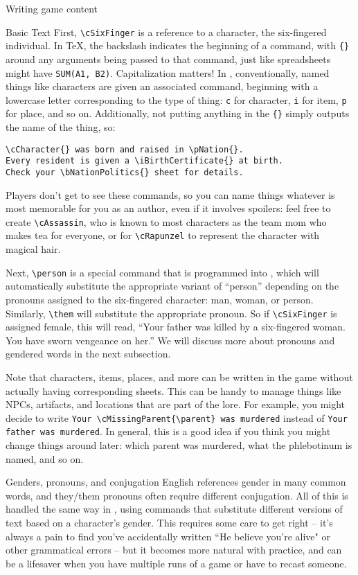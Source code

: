 \documentclass{article}
\begin{document}
\begin{section}{Writing game content}
\begin{subsection}{Basic \gametex{} Text}
First, \lstinline{\cSixFinger} is a reference to a character, the six-fingered individual.  In \TeX{}, the backslash indicates the beginning of a command, with \lstinline|{}| around any arguments being passed to that command, just like spreadsheets might have \texttt{SUM(A1, B2)}.  Capitalization matters!  In \gametex{}, conventionally, named things like characters are given an associated command, beginning with a lowercase letter corresponding to the type of thing: \lstinline{c} for character, \lstinline{i} for item, \lstinline{p} for place, and so on.  Additionally, not putting anything in the \lstinline|{}| simply outputs the name of the thing, so: 
\begin{verbatim}
\cCharacter{} was born and raised in \pNation{}.
Every resident is given a \iBirthCertificate{} at birth.
Check your \bNationPolitics{} sheet for details.
\end{verbatim}

Players don't get to see these commands, so you can name things whatever is most memorable for you as an author, even if it involves spoilers: feel free to create \lstinline|\cAssassin|, who is known to most characters as the team mom who makes tea for everyone, or for \lstinline{\cRapunzel} to represent the character with magical hair.

Next, \lstinline{\person} is a special command that is programmed into \gametex{}, which will automatically substitute the appropriate variant of ``person'' depending on the pronouns assigned to the six-fingered character: man, woman, or person.  Similarly, \lstinline{\them} will substitute the appropriate pronoun.  So if \lstinline{\cSixFinger} is assigned female, this will read, ``Your father was killed by a six-fingered woman.  You have sworn vengeance on her.''  We will discuss more about pronouns and gendered words in the next subsection.

Note that characters, items, places, and more can be written in the game without actually having corresponding sheets.  This can be handy to manage things like NPCs, artifacts, and locations that are part of the lore.  For example, you might decide to write \lstinline|Your \cMissingParent{\parent} was murdered| instead of \lstinline|Your father was murdered|.  In general, this is a good idea if you think you might change things around later: which parent was murdered, what the phlebotinum is named, and so on.
\end{subsection}
\begin{subsection}{Genders, pronouns, and conjugation}
English references gender in many common words, and they/them pronouns often require different conjugation.  All of this is handled the same way in \gametex{}, using commands that substitute different versions of text based on a character's gender.  This requires some care to get right – it's always a pain to find you've accidentally written ``He believe you're alive" or other grammatical errors – but it becomes more natural with practice, and can be a lifesaver when you have multiple runs of a game or have to recast someone.


\end{subsection}
\end{section}
\end{document}
